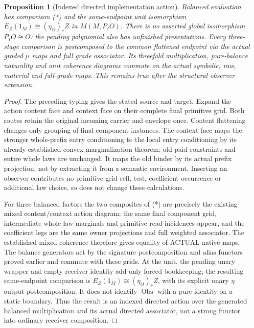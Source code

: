 \documentclass{article}
\newtheorem{proposition}{Proposition}
\begin{document}
\begin{proposition}[Indexed directed implementation action]
Balanced evaluation has comparison (*) and the same-endpoint unit isomorphism $E_Z(1_M)\cong(\eta_O)_*Z$ in $M(M,P_IO)$. There is no asserted global isomorphism $P_IO\cong O$: the pending polynomial also has unfinished presentations. Every three-stage comparison is postcomposed to the common flattened endpoint via the actual graded $\mu$ maps and full grade associator. Its threefold multiplication, pure-balance naturality and unit coherence diagrams commute on the actual symbolic, raw, material and full-grade maps. This remains true after the structural observer extension.
\end{proposition}
\begin{proof}
The preceding typing gives the stated source and target. Expand the action content face and context face on their complete final primitive grid. Both routes retain the original incoming carrier and envelope once. Content flattening changes only grouping of final component instances. The context face maps the stronger whole-prefix entry conditioning to the local entry conditioning by its already established convex marginalization theorem; old paid constraints and entire whole laws are unchanged. It maps the old binder by its actual prefix projection, not by extracting it from a semantic environment. Inserting an observer contributes no primitive grid cell, test, coefficient occurrence or additional law choice, so does not change these calculations.

For three balanced factors the two composites of (*) are precisely the existing mixed content/context action diagram: the same final component grid, intermediate whole-law marginals and primitive read incidences appear, and the coefficient legs are the same owner projections and full weighted associator. The established mixed coherence therefore gives equality of ACTUAL native maps. The balance generators act by the signature postcomposition and alias functors proved earlier and commute with these grids. At the unit, the pending unary wrapper and empty receiver identity add only forced bookkeeping; the resulting same-endpoint comparison is $E_Z(1_M)\cong(\eta_O)_*Z$, with its explicit unary $\eta$ output postcomposition. It does not identify $\operatorname{Obs}$ with a pure identity on a static boundary. Thus the result is an indexed directed action over the generated balanced multiplication and its actual directed associator, not a strong functor into ordinary receiver composition.
\end{proof}
\end{document}
